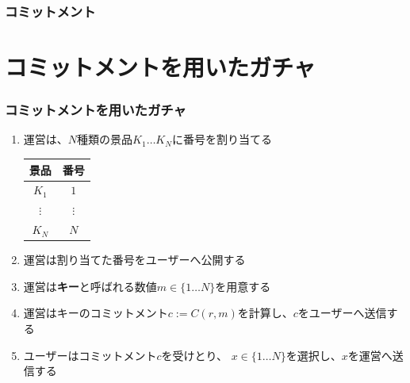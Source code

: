 \begin{frame}
  \frametitle{コミットメント}


\end{frame}


\section{コミットメントを用いたガチャ}

\begin{frame}
  \frametitle{コミットメントを用いたガチャ}
  
  \begin{enumerate}
    \item<2-> \label{item:assign}
      運営は、$N$種類の景品$K_1 \dots K_N$に番号を割り当てる
      \begin{table}[h]
        \begin{tabular}{c|c}
          景品 & 番号 \\
          \hline \hline
          $K_1$ & $1$ \\
          $\vdots$ & $\vdots$ \\
          $K_N$ & $N$ \\
        \end{tabular}
      \end{table}
    \item<3-> 運営は割り当てた番号をユーザーへ公開する
    \item<4-> 運営は\textbf{キー}と呼ばれる数値$m \in \{1 \dots N\}$を用意する
    \item<5-> 運営はキーのコミットメント$c := C(r, m)$を計算し、$c$をユーザーへ送信する
    \item<6-> ユーザーはコミットメント$c$を受けとり、
      $x \in \{1 \dots N\}$を選択し、$x$を運営へ送信する
  \end{enumerate}
\end{frame}

